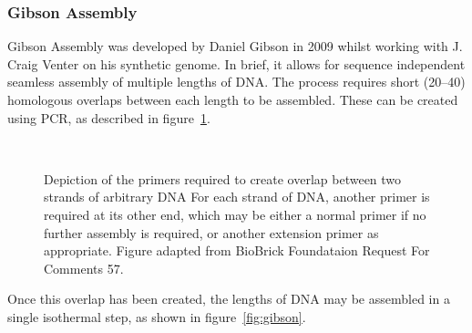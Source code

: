 \documentclass[../main.tex]{subfiles}
\begin{document}
\subsubsection{Gibson Assembly}

Gibson Assembly was developed by Daniel Gibson\cite{gibson09} in 2009 whilst working with J. Craig Venter on his synthetic genome\cite{venter10}. In brief, it allows for sequence independent seamless assembly of multiple lengths of DNA. The process requires short (\SIrange{20}{40}{\base}) homologous overlaps between each length to be assembled. These can be created using PCR, as described in figure~\ref{fig:gibsonPCR}.
\begin{figure}[h!]
\\
\caption{Depiction of the primers required to create overlap between two strands of arbitrary DNA For each strand of DNA, another primer is required at its other end, which may be either a normal primer if no further assembly is required, or another extension primer as appropriate. Figure adapted from BioBrick Foundataion Request For Comments 57\cite{rfc57}.}
\label{fig:gibsonPCR}
\end{figure}

Once this overlap has been created, the lengths of DNA may be assembled in a single isothermal step, as shown in figure~\ref{fig:gibson}. 
\end{document}
